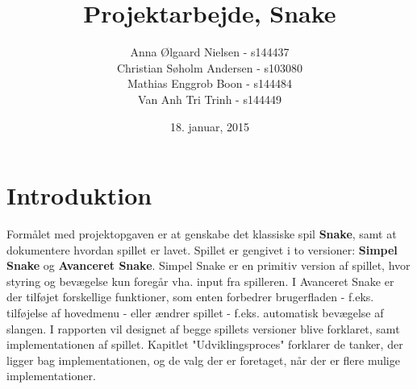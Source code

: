 \documentclass{report}
\begin{document}
\setcounter{chapter}{0}

\title{Projektarbejde, Snake}
\date{18. januar, 2015}
\author{	Anna Ølgaard Nielsen - 			s144437\\
Christian Søholm Andersen 	- s103080\\
Mathias Enggrob Boon - 			s144484\\
Van Anh Tri Trinh - 				s144449}

\maketitle

\tableofcontents
\newpage
\setcounter{chapter}{0}
\chapter{Introduktion}
Formålet med projektopgaven er at genskabe det klassiske spil \textbf{Snake}, samt at dokumentere hvordan spillet er lavet.
Spillet er gengivet i to versioner: \textbf{Simpel Snake} og \textbf{Avanceret Snake}. Simpel Snake er en primitiv version af spillet, hvor styring og bevægelse kun foregår vha. input fra spilleren. I Avanceret Snake er der tilføjet forskellige funktioner, som enten forbedrer brugerfladen - f.eks. tilføjelse af hovedmenu - eller ændrer spillet - f.eks. automatisk bevægelse af slangen.
I rapporten vil designet af begge spillets versioner blive forklaret, samt implementationen af spillet. Kapitlet "Udviklingsproces" forklarer de tanker, der ligger bag implementationen, og de valg der er foretaget, når der er flere mulige implementationer.

\begin{figure}[b]
	\centering
	\graphicspath{ {pics/} }
	\hspace{0.1\textwidth}
\end{figure}
\end{document}
